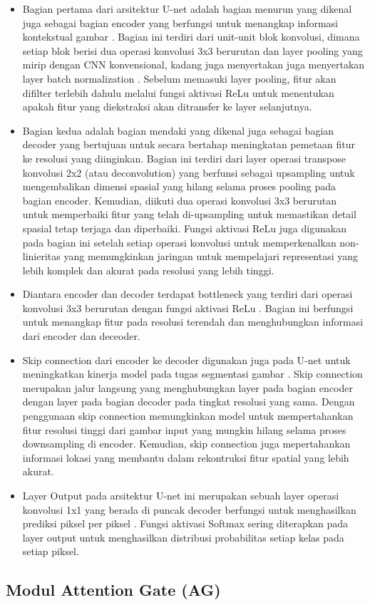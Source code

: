 \begin{itemize}
	\item Bagian pertama dari arsitektur U-net adalah bagian menurun yang dikenal juga sebagai bagian encoder yang berfungsi untuk menangkap informasi kontekstual gambar \cite{azad_medical_2022}. Bagian ini terdiri dari unit-unit blok konvolusi, dimana setiap blok berisi dua operasi konvolusi 3x3 berurutan dan layer pooling yang mirip dengan CNN konvensional, kadang juga menyertakan juga menyertakan layer batch normalization \cite{younisse_fine-tuning_2023}. Sebelum memasuki layer pooling, fitur akan difilter terlebih dahulu melalui fungsi aktivasi ReLu untuk menentukan apakah fitur yang diekstraksi akan ditransfer ke layer selanjutnya.
	
	\item Bagian kedua adalah bagian mendaki yang dikenal juga sebagai bagian decoder yang bertujuan untuk secara bertahap meningkatan pemetaan fitur ke resolusi yang diinginkan\cite{siddique_u-net_2020}. Bagian ini terdiri dari layer operasi transpose konvolusi 2x2 (atau deconvolution) yang berfunsi sebagai upsampling untuk mengembalikan dimensi spasial yang hilang selama proses pooling pada bagian encoder. Kemudian, diikuti dua operasi konvolusi 3x3 berurutan untuk memperbaiki fitur yang telah di-upsampling untuk memastikan detail spasial tetap terjaga dan diperbaiki\cite{purushothaman_image_2022}. Fungsi aktivasi ReLu juga digunakan pada bagian ini setelah setiap operasi konvolusi untuk memperkenalkan non-linieritas yang memungkinkan jaringan untuk mempelajari representasi yang lebih komplek dan akurat pada resolusi yang lebih tinggi\cite{huang_fully_2022}.
	
	\item Diantara encoder dan decoder terdapat bottleneck yang terdiri dari operasi konvolusi 3x3 berurutan dengan fungsi aktivasi ReLu \cite{azad_medical_2022}. Bagian ini berfungsi untuk menangkap fitur pada resolusi terendah dan menghubungkan informasi dari encoder dan deceoder.
	
	\item Skip connection dari encoder ke decoder digunakan juga pada U-net untuk meningkatkan kinerja model pada tugas segmentasi gambar \cite{azad_medical_2022}. Skip connection  merupakan jalur langsung yang menghubungkan layer pada bagian encoder dengan layer pada bagian decoder pada tingkat resolusi yang sama. Dengan penggunaan skip connection memungkinkan model untuk mempertahankan fitur resolusi tinggi dari gambar input yang mungkin hilang selama proses downsampling di encoder. Kemudian, skip connection juga mepertahankan informasi lokasi yang membantu dalam rekontruksi fitur spatial yang lebih akurat\cite{siddique_u-net_2020}.
	
	\item Layer Output  pada arsitektur U-net ini merupakan sebuah layer operasi konvolusi 1x1 yang berada di puncak decoder berfungsi untuk menghasilkan prediksi piksel per piksel \cite{huang_fully_2022,azad_medical_2022}. Fungsi aktivasi Softmax sering diterapkan pada layer output untuk menghasilkan distribusi probabilitas setiap kelas pada setiap piksel. 
	
	
\end{itemize}



\subsection{Modul Attention Gate (AG)}




